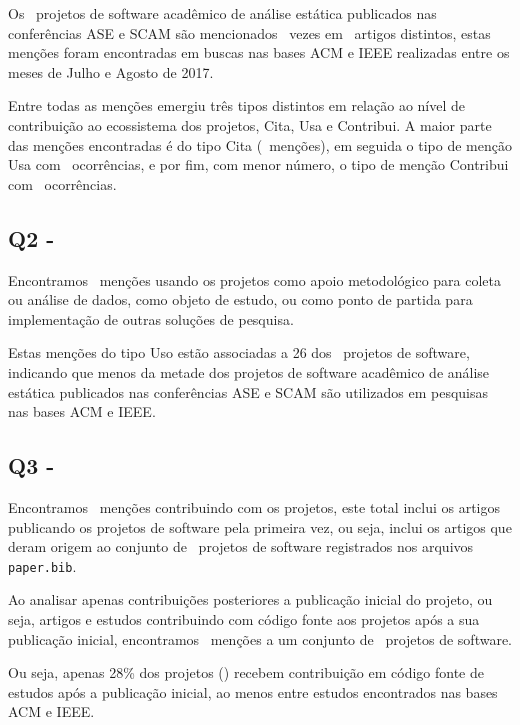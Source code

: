 Os \SoftwareCount \ projetos de software acadêmico de análise estática
publicados nas conferências ASE e SCAM são mencionados \ScreeningCount \ vezes
em \ScreeningUniqueCount \ artigos distintos, estas menções foram encontradas
em buscas nas bases ACM e IEEE realizadas entre os meses de Julho e Agosto de
2017.

Entre todas as menções emergiu três tipos distintos em relação ao nível de
contribuição ao ecossistema dos projetos, Cita, Usa e Contribui. A maior parte
das menções encontradas é do tipo Cita (\CiteCount \ menções), em seguida
o tipo de menção Usa com \UseCount \ ocorrências, e por fim, com menor número,
o tipo de menção Contribui com \ContributeCount \ ocorrências.

\subsection{Q2 - \EstudoDoisQuestaoDois}

Encontramos \UseCount \ menções usando os projetos como apoio metodológico para
coleta ou análise de dados, como objeto de estudo, ou como ponto de partida
para implementação de outras soluções de pesquisa.

Estas menções do tipo Uso estão associadas a 26 dos \SoftwareCount \ projetos
de software, indicando que menos da metade dos projetos de software acadêmico
de análise estática publicados nas conferências ASE e SCAM são utilizados em
pesquisas nas bases ACM e IEEE.

\subsection{Q3 - \EstudoDoisQuestaoTres}

Encontramos \ContributeCount \ menções contribuindo com os projetos, este total
inclui os artigos publicando os projetos de software pela primeira vez, ou
seja, inclui os artigos que deram origem ao conjunto de \SoftwareCount \
projetos de software registrados nos arquivos \texttt{paper.bib}.

Ao analisar apenas contribuições posteriores a publicação inicial
do projeto, ou seja, artigos e estudos contribuindo com código
fonte aos projetos após a sua publicação inicial, encontramos
\ContributeStudyDoisCount \ menções a um conjunto de
\ContributeStudyDoisSoftware \ projetos de software.

Ou seja, apenas 28\% dos projetos ()
recebem contribuição em código fonte de estudos após a publicação inicial, ao
menos entre estudos encontrados nas bases ACM e IEEE.

